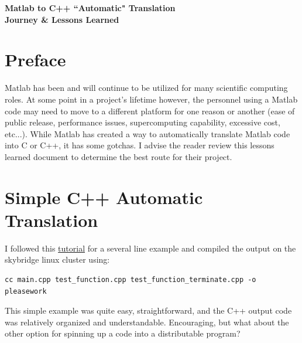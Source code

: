 \documentclass{article}
\begin{document}
\begin{center}
\begin{LARGE}
\textbf{Matlab to C++ ``Automatic" Translation \\ Journey \& Lessons Learned }\\
\end{LARGE}
\vspace{8pt}
\end{center}

\section{Preface}

Matlab has been and will continue to be utilized for many scientific computing roles.  At some point in a project's lifetime however, the personnel using a Matlab code may need to move to a different platform for one reason or another (ease of public release, performance issues, supercomputing capability, excessive cost, etc...).  While Matlab has created a way to automatically translate Matlab code into C or C++, it has some gotchas.  I advise the reader review this lessons learned document to determine the best route for their project.  

\section{Simple C++ Automatic Translation}
I followed this \href{https://www.mathworks.com/videos/automatically-converting-matlab-code-to-c-code-96483.html}{tutorial} for a several line example and compiled the output on the skybridge linux cluster using:
\begin{verbatim}
cc main.cpp test_function.cpp test_function_terminate.cpp -o pleasework
\end{verbatim}


This simple example was quite easy, straightforward, and the C++ output code was relatively organized and understandable.  Encouraging, but what about the other option for spinning up a code into a distributable program?
\end{document}
